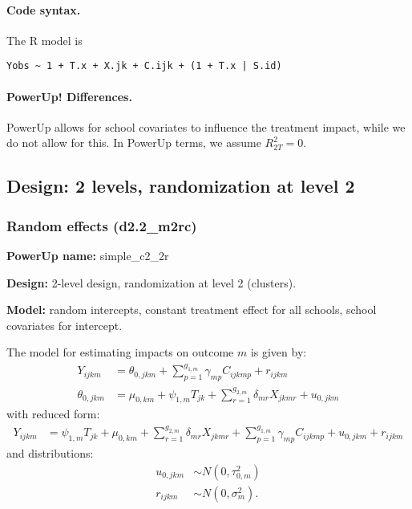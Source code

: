 \documentclass[12pt]{article}
\begin{document}
\paragraph{Code syntax.}
The R model is
\begin{verbatim}
Yobs ~ 1 + T.x + X.jk + C.ijk + (1 + T.x | S.id)
\end{verbatim}

\paragraph{PowerUp! Differences.}
PowerUp allows for school covariates to influence the treatment impact, while we do not allow for this. In PowerUp terms, we assume $R^2_{2T} = 0$.



\newpage 
\subsection{Design: 2 levels, randomization at level 2}


\subsubsection{Random effects (d2.2\_m2rc)}

\textbf{PowerUp name:} simple\_c2\_2r


\textbf{Design:} 2-level design, randomization at level 2 (clusters).

\textbf{Model:} random intercepts, constant treatment effect for all schools, school covariates for intercept.

The model for estimating impacts on outcome $m$ is given by:
\begin{align}
Y_{ijkm} &=  \theta_{0,jkm} + \sum_{p=1}^{g_{1,m}} \gamma_{mp} C_{ijkmp} + r_{ijkm}\\
\nonumber \theta_{0,jkm} &= \mu_{0,km} + \psi_{1,m} T_{jk} + \sum_{r=1}^{g_{2,m}} \delta_{mr} X_{jkmr} + u_{0,jkm}
\end{align}
with reduced form:
\begin{align}
Y_{ijkm} &= \psi_{1,m} T_{jk} + \mu_{0,km} + \sum_{r=1}^{g_{2,m}} \delta_{mr} X_{jkmr} + \sum_{p=1}^{g_{1,m}} \gamma_{mp} C_{ijkmp} + u_{0,jkm} + r_{ijkm}
\end{align}
and distributions:
\begin{align}
u_{0,jkm} &\sim N\left(0, \tau^2_{0,m}\right)\\
\nonumber r_{ijkm} &\sim N\left(0, \sigma^2_m\right).
\end{align}
\end{document}
